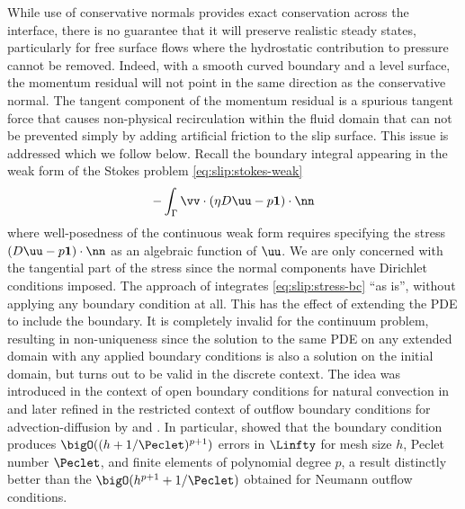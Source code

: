 While use of conservative normals provides exact conservation across the interface, there is no guarantee that it will preserve realistic steady states, particularly for free surface flows where the hydrostatic contribution to pressure cannot be removed.
Indeed, with a smooth curved boundary and a level surface, the momentum residual will not point in the same direction as the conservative normal.
The tangent component of the momentum residual is a spurious tangent force that causes non-physical recirculation within the fluid domain that can not be prevented simply by adding artificial friction to the slip surface.
This issue is addressed \citet{behr2004application} which we follow below.
Recall the boundary integral appearing in the weak form of the Stokes problem \eqref{eq:slip:stokes-weak}
\begin{equation}\label{eq:slip:stress-bc}
  - \int_\Gamma \vv\cdot (\eta D\uu - p\bm 1)\cdot\nn
\end{equation}
where well-posedness of the continuous weak form requires specifying the stress $(D\uu - p\bm 1)\cdot\nn$ as an algebraic function of $\uu$.
We are only concerned with the tangential part of the stress since the normal components have Dirichlet conditions imposed.
The approach of \citet{behr2004application} integrates \eqref{eq:slip:stress-bc} ``as is'', without applying any boundary condition at all.
This has the effect of extending the PDE to include the boundary.
It is completely invalid for the continuum problem, resulting in non-uniqueness since the solution to the same PDE on any extended domain with any applied boundary conditions is also a solution on the initial domain, but turns out to be valid in the discrete context.
The idea was introduced in the context of open boundary conditions for natural convection in \citet{papanastasiou1992nob} and later refined 
in the restricted context of outflow boundary conditions for advection-diffusion by \citet{griffiths1997nbc} and \citet{renardy1997inb}.
In particular, \citet{griffiths1997nbc} showed that the boundary condition produces $\bigO((h+1/\Peclet)^{p+1})$ errors in $\Linfty$ for mesh size $h$, Peclet number $\Peclet$, and finite elements of polynomial degree $p$, a result distinctly better than the $\bigO(h^{p+1} + 1/\Peclet)$ obtained for Neumann outflow conditions.
